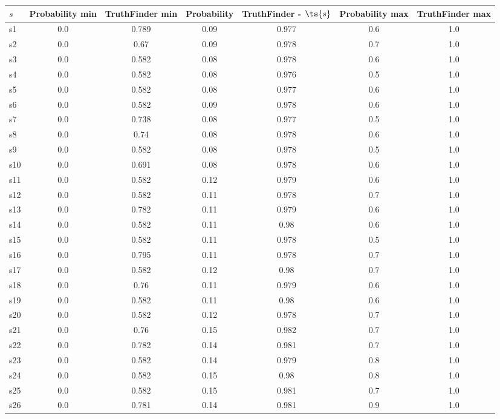 \documentclass{article}
\begin{document}
\noindent\begin{tabular}{|l|c|c|c|c|c|c|}
\hline
$s$& Probability min & TruthFinder min & Probability & TruthFinder - $\ts{s}$ & Probability max & TruthFinder max\\
\hline
s1 &0.0 & 0.789 & 0.09 & 0.977 & 0.6 & 1.0\\
\hline
s2 &0.0 & 0.67 & 0.09 & 0.978 & 0.7 & 1.0\\
\hline
s3 &0.0 & 0.582 & 0.08 & 0.978 & 0.6 & 1.0\\
\hline
s4 &0.0 & 0.582 & 0.08 & 0.976 & 0.5 & 1.0\\
\hline
s5 &0.0 & 0.582 & 0.08 & 0.977 & 0.6 & 1.0\\
\hline
s6 &0.0 & 0.582 & 0.09 & 0.978 & 0.6 & 1.0\\
\hline
s7 &0.0 & 0.738 & 0.08 & 0.977 & 0.5 & 1.0\\
\hline
s8 &0.0 & 0.74 & 0.08 & 0.978 & 0.6 & 1.0\\
\hline
s9 &0.0 & 0.582 & 0.08 & 0.978 & 0.5 & 1.0\\
\hline
s10 &0.0 & 0.691 & 0.08 & 0.978 & 0.6 & 1.0\\
\hline
s11 &0.0 & 0.582 & 0.12 & 0.979 & 0.6 & 1.0\\
\hline
s12 &0.0 & 0.582 & 0.11 & 0.978 & 0.7 & 1.0\\
\hline
s13 &0.0 & 0.782 & 0.11 & 0.979 & 0.6 & 1.0\\
\hline
s14 &0.0 & 0.582 & 0.11 & 0.98 & 0.6 & 1.0\\
\hline
s15 &0.0 & 0.582 & 0.11 & 0.978 & 0.5 & 1.0\\
\hline
s16 &0.0 & 0.795 & 0.11 & 0.978 & 0.7 & 1.0\\
\hline
s17 &0.0 & 0.582 & 0.12 & 0.98 & 0.7 & 1.0\\
\hline
s18 &0.0 & 0.76 & 0.11 & 0.979 & 0.6 & 1.0\\
\hline
s19 &0.0 & 0.582 & 0.11 & 0.98 & 0.6 & 1.0\\
\hline
s20 &0.0 & 0.582 & 0.12 & 0.978 & 0.7 & 1.0\\
\hline
s21 &0.0 & 0.76 & 0.15 & 0.982 & 0.7 & 1.0\\
\hline
s22 &0.0 & 0.782 & 0.14 & 0.981 & 0.7 & 1.0\\
\hline
s23 &0.0 & 0.582 & 0.14 & 0.979 & 0.8 & 1.0\\
\hline
s24 &0.0 & 0.582 & 0.15 & 0.98 & 0.8 & 1.0\\
\hline
s25 &0.0 & 0.582 & 0.15 & 0.981 & 0.7 & 1.0\\
\hline
s26 &0.0 & 0.781 & 0.14 & 0.981 & 0.9 & 1.0\\

\end{tabular}
\end{document}
